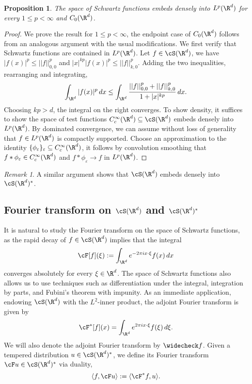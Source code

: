 \documentclass[reqno]{amsart}
\newtheorem{proposition}[theorem]{Proposition}
\theoremstyle{definition}
\theoremstyle{remark}
\newtheorem*{remark}{Remark}
\renewcommand{\epsilon}{\varepsilon}
\begin{document}
\begin{proposition}
	The space of Schwartz functions embeds densely into $L^p (\R^d)$ for every $1 \leq p < \infty$ and $C_0 (\R^d)$. 
\end{proposition}

\begin{proof}
	We prove the result for $1 \leq p < \infty$, the endpoint case of $C_0 (\R^d)$ follows from an analogous argument with the usual modifications. We first verify that Schwartz functions are contained in $L^p (\R^d)$. Let $f \in \cS (\R^d)$, we have $|f(x)|^p \leq ||f||_{0, 0}^p$ and $|x|^{kp} |f(x)|^p \leq ||f||_{k, 0}^p$. Adding the two inequalities, rearranging and integrating, 
		\[ \int_{\R^d} |f(x)|^p \, dx \leq \int_{\R^d} \frac{||f||_{0, 0}^p + ||f||_{k, 0}^p}{1 + |x|^{kp}} \, dx . \]
	Choosing $kp > d$, the integral on the right converges. To show density, it suffices to show the space of test functions $C^\infty_c (\R^d) \subseteq \cS (\R^d)$ embeds densely into $L^p (\R^d)$. By dominated convergence, we can assume without loss of generality that $f \in L^p (\R^d)$ is compactly supported. Choose an approximation to the identity $\{\phi_\epsilon\}_\epsilon \subseteq C^\infty_c (\R^d)$, it follows by convolution smoothing that $f * \phi_\epsilon \in C^\infty_c (\R^d)$ and $f * \phi_\epsilon \to f$ in $L^p (\R^d)$.
\end{proof}

\begin{remark}
	A similar argument shows that $\cS (\R^d)$ embeds densely into $\cS (\R^d)^*$. 
\end{remark}

\subsection{Fourier transform on $\cS (\R^d)$ and $\cS (\R^d)^*$}

It is natural to study the Fourier transform	on the space of Schwartz functions, as the rapid decay of $f \in \cS(\R^d)$ implies that the integral
	\[ \cF [f] (\xi) := \int_{\R^d} e^{-2\pi i x \cdot \xi} f(x) \, dx \]	
converges absolutely for every $\xi \in \R^d$. The space of Schwartz functions also allows us to use techniques such as differentiation under the integral, integration by parts, and Fubini's theorem with impunity. As an immediate application, endowing $\cS (\R^d)$ with the $L^2$-inner product, the adjoint Fourier transform is given by 
	\[ \cF^* [f] (x) = \int_{\R^d} e^{2\pi i x \cdot \xi} f(\xi) \, d \xi. \]
We will also denote the adjoint Fourier transform by $\widecheck f$. Given a tempered distribution $u \in \cS(\R^d)^*$, we define its Fourier transform $\cF u \in \cS (\R^d)^*$ via duality, 
	\[ \langle f, \cF u \rangle := \langle \cF^* f, u \rangle.  \]
\end{document}
